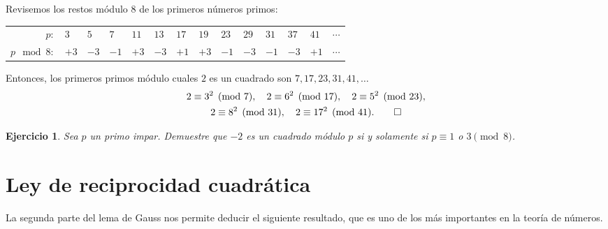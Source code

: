 \documentclass{article}
\theoremstyle{plain}
\newtheorem{ejerc}{Ejercicio}
\begin{document}
\begin{ejemplo}
  Revisemos los restos módulo $8$ de los primeros números primos:
  \begin{center}
    \begin{tabular}{rx{0.5cm}x{0.5cm}x{0.5cm}x{0.5cm}x{0.5cm}x{0.5cm}x{0.5cm}x{0.5cm}x{0.5cm}x{0.5cm}x{0.5cm}x{0.5cm}c}
 \hline
$p\colon$ & $3$ & $5$ & $7$ & $11$ & $13$ & $17$ & $19$ & $23$ & $29$ & $31$ & $37$ & $41$ & $\cdots$ \tabularnewline
$p\mod 8\colon$ & $+3$ & $-3$ & $-1$ & $+3$ & $-3$ & $+1$ & $+3$ & $-1$ & $-3$ & $-1$ & $-3$ & $+1$ & $\cdots$ \tabularnewline
\hline
    \end{tabular}
  \end{center}

  Entonces, los primeros primos módulo cuales $2$ es un cuadrado son
  $7, 17, 23, 31, 41, \ldots$
  \begin{gather*}
    2 \equiv 3^2 \pmod{7}, \quad 2 \equiv 6^2 \pmod{17}, \quad 2 \equiv 5^2 \pmod{23},\\
    2 \equiv 8^2 \pmod{31}, \quad 2 \equiv 17^2 \pmod{41}. \qedhere
  \end{gather*}
\end{ejemplo}

\begin{ejerc}
  Sea $p$ un primo impar. Demuestre que $-2$ es un cuadrado módulo $p$ si y
  solamente si $p \equiv 1$ o $3 \pmod{8}$.
\end{ejerc}


\section{Ley de reciprocidad cuadrática}

La segunda parte del lema de Gauss nos permite deducir el siguiente resultado,
que es uno de los más importantes en la teoría de números.
\end{document}

